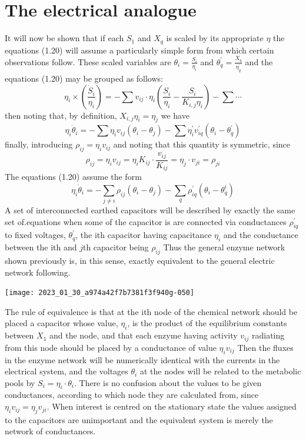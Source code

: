 \section{The electrical analogue}

It will now be shown that if each $S_{1}$ and $X_{q}$ is scaled by its appropriate $\eta$ the equations (1.20) will assume a particularly simple form from which certain observations follow. These scaled variables are $\theta_{i}=\frac{S_{i}}{\eta_{i}}$ and $\theta_{q}^{\prime}=\frac{X_{q}}{\eta^{\prime}_q}$ and the equations (1.20) may be grouped as follows:
%
$$
\eta_{i} \times \left(\frac{\dot{S}_{i}}{\eta_{i}}\right) = -\sum v_{ij} \cdot \eta_{i}\left(\frac{S_{i}}{\eta_{i}}-\frac{S_{i}}{K_{i,j} \eta_{i}}\right)- \sum \cdots
$$
%
then noting that, by definition, $X_{i,j} \eta_{i}=\eta_{j}$ we have
%
$$
\eta_{i} \dot{\theta}_{i}=-\sum \eta_{i} v_{ij}\left(\theta_{i}-\theta_{j}\right)- \sum \eta_{i}^{\prime} v_{iq}^{\prime}\left(\theta_{i}-\theta_{q}^{\prime}\right)
$$
%
finally, introducing $\rho_{ij}=\eta_{i} v_{ij}$ and noting that this quantity is symmetric, since
%
$$
\rho_{ij}=\eta_{i} v_{ij}=\eta_{i} K_{ij} \cdot \frac{v_{i j}}{K_{i j}}=\eta_{j} \cdot v_{ji}=\rho_{ji}
$$
%
The equations (1.20) assume the form
%
\begin{equation}
\eta_{i} \dot{\theta}_{i}=-\sum_{j \neq i} \rho_{i j}\left(\theta_{i}-\theta_{j}\right)-\sum_{q} \rho_{iq}^{'}\left(\theta_{i} - \theta_{q}^{i}\right)
\label{eqn:121}
\end{equation}
%
A set of interconnected earthed capacitors will be described by exactly the same set of.equations when some of the capacitor is are connected via conductances $\rho_{i q}^{\prime}$ to fixed voltages, $\theta_{q}^{\prime}$, the ith capacitor having capacitance $\eta_{i}$ and the conductance between the ith and $j$th capacitor being $\rho_{i j}$ Thus the general enzyme network shown previously is, in this sense, exactly equivalent to the general electric network following.

\begin{center}
\texttt{[image: 2023\_01\_30\_a974a42f7b7381f3f940g-050]}
\end{center}

The rule of equivalence is that at the ith node of the chemical network should be placed a capacitor whose value, $\eta_{i}$, is the product of the equilibrium constants between $X_{1}$ and the node, and that each enzyme having activity $v_{ij}$ radiating from this node should be placed by a conductance of value $\eta_{i} v_{ij}$ Then the fluxes in the enzyme network will be numerically identical with the currents in the electrical system, and the voltages $\theta_{i}$ at the nodes will be related to the metabolic pools by $S_{i}=\eta_{i} \cdot \theta_{i}$. There is no confusion about the values to be given conductances, according to which node they are calculated from, since $\eta_{i} v_{ij}=\eta_{j} v_{ji}$. When interest is centred on the stationary state the values assigned to the capacitors are unimportant and the equivalent system is merely the network of conductances.

